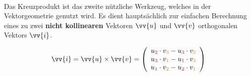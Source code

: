     \paragraph{} Das Kreuzprodukt ist das zweite nützliche Werkzeug, welches in der Vektorgeometrie genutzt wird. Es dient hauptsächlich zur einfachen Berechnung
    eines zu zwei \textbf{nicht kollinearen} Vektoren $\vv{u}$ und $\vv{v}$ orthogonalen Vektors $\vv{i}$. \\
    \begin{Definition}
      $$\vv{i} = \vv{u} \times \vv{v} \definedBy \left(\begin{array}{c} u_{\textcolor{red}{2}} \cdot v_{\textcolor{orange}{3}} - u_{\textcolor{red}{3}} \cdot v_{\textcolor{orange}{2}} \\ u_{\textcolor{red}{3}} \cdot v_{\textcolor{orange}{1}} - u_{\textcolor{red}{1}} \cdot v_{\textcolor{orange}{3}} \\ u_{\textcolor{red}{1}} \cdot v_{\textcolor{orange}{2}} - u_{\textcolor{red}{2}} \cdot v_{\textcolor{orange}{1}} \end{array}\right)$$
    \end{Definition}

